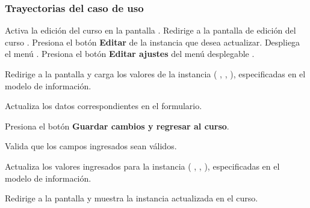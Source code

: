 \begin{UseCase}
{	}








\end{UseCase}

\subsubsection{Trayectorias del caso de uso}

\begin{UCtrayectoria}%
%

    \Actor Activa la edición del curso en la pantalla .
    \Sistema Redirige a la pantalla de edición del curso .
    \Actor Presiona el botón {\bf Editar} de la instancia que desea actualizar.
    \Sistema Despliega el menú .
    \Actor Presiona el botón {\bf Editar ajustes} del menú desplegable .

    \Sistema Redirige a la pantalla  y carga los valores de la instancia  (
      ,
      ,
      ), especificadas en el modelo de información.

    \label{CU-C05-muestra-pantalla}

    \Actor Actualiza los datos correspondientes en el formulario.

    \Actor Presiona el botón {\bf Guardar cambios y regresar al curso}. 

    \Sistema Valida que los campos ingresados sean válidos.  

    \Sistema Actualiza los valores ingresados para la instancia  (
      ,
      ,
      ), especificadas en el modelo de información.

    \Sistema Redirige a la pantalla  y muestra la instancia actualizada en el curso.

\end{UCtrayectoria}

